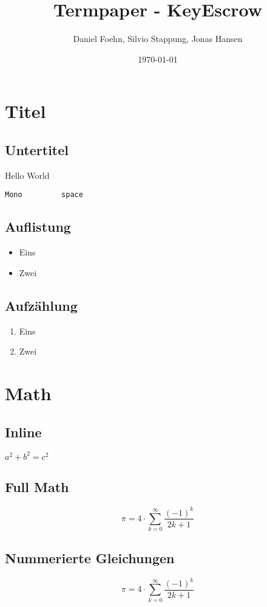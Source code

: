 \documentclass[a4paper, 10pt, fleqn]{article}
\title{Termpaper - KeyEscrow}
\author{Daniel Foehn, Silvio Stappung, Jonas Hansen}
\date{\today} %
\begin{document}
\maketitle
\tableofcontents
\clearpage
\section{Titel}
\subsection{Untertitel}
Hello World

\verb!Mono         space!

\subsection{Auflistung}
\begin{itemize}
\item Eins
\item Zwei
\end{itemize}

\subsection{Aufzählung}
\begin{enumerate}[a]%
\item Eins
\item Zwei
\end{enumerate}

\section{Math}
\subsection{Inline}
$a^2 + b^2 = c^2$
\subsection{Full Math}
\[
\pi = 4 \cdot \sum\limits_{k=0}^\infty\frac{(-1)^k}{2 k + 1}
\]
\subsection{Nummerierte Gleichungen}
\begin{equation}
\pi = 4 \cdot \sum\limits_{k=0}^\infty\frac{(-1)^k}{2 k + 1}
\end{equation}
\end{document}
